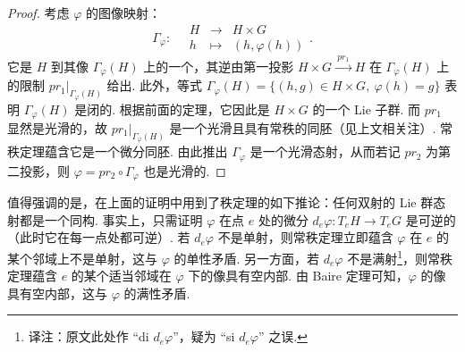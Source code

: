\begin{proof}
考虑 $\varphi$ 的图像映射：
\[
\Gamma_{\varphi}:\quad
\begin{array}{rcl}
H & \longrightarrow & H\times G\\
h & \longmapsto & (h,\varphi(h))
\end{array}.
\]
它是 $H$ 到其像 $\Gamma_{\varphi}(H)$ 上的一个，其逆由第一投影 $H\times G\xrightarrow{\ pr_{1}\ }H$ 在 $\Gamma_{\varphi}(H)$ 上的限制 $pr_{1}|_{\Gamma_{\varphi}(H)}$ 给出. 此外，等式 $\Gamma_{\varphi}(H)=\{(h,g)\in H\times G,\ \varphi(h)=g\}$ 表明 $\Gamma_{\varphi}(H)$ 是闭的. 根据前面的定理，它因此是 $H\times G$ 的一个 Lie 子群. 而 $pr_{1}$ 显然是光滑的，故 $pr_{1}|_{\Gamma_{\varphi}(H)}$ 是一个光滑且具有常秩的同胚（见上文相关注）. 常秩定理蕴含它是一个微分同胚. 由此推出 $\Gamma_{\varphi}$ 是一个光滑态射，从而若记 $pr_{2}$ 为第二投影，则 $\varphi=pr_{2}\circ\Gamma_{\varphi}$ 也是光滑的.
\end{proof}

\begin{remark}\label{rem:lie-1-1-10}
值得强调的是，在上面的证明中用到了秩定理的如下推论：任何双射的 Lie 群态射都是一个同构. 事实上，只需证明 $\varphi$ 在点 $e$ 处的微分 $d_{e}\varphi:T_{e}H\longrightarrow T_{e}G$ 是可逆的（此时它在每一点处都可逆）. 若 $d_{e}\varphi$ 不是单射，则常秩定理立即蕴含 $\varphi$ 在 $e$ 的某个邻域上不是单射，这与 $\varphi$ 的单性矛盾. 另一方面，若 $d_{e}\varphi$ 不是满射\footnote{译注：原文此处作 ``di $d_{e}\varphi$''，疑为 ``si $d_{e}\varphi$'' 之误.}，则常秩定理蕴含 $e$ 的某个适当邻域在 $\varphi$ 下的像具有空内部. 由 Baire 定理可知，$\varphi$ 的像具有空内部，这与 $\varphi$ 的满性矛盾.
\end{remark}
